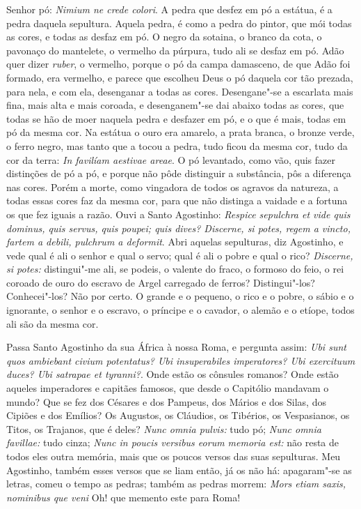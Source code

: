 Senhor pó: \emph{Nimium ne crede colori}. A pedra que desfez em pó a
estátua, é a pedra daquela sepultura. Aquela pedra, é como a pedra do
pintor, que mói todas as cores, e todas as desfaz em pó. O negro da
sotaina, o branco da cota, o pavonaço do mantelete, o vermelho da
púrpura, tudo ali se desfaz em pó. Adão quer dizer \emph{ruber}, o
vermelho, porque o pó da campa damasceno, de que Adão foi formado, era
vermelho, e parece que escolheu Deus o pó daquela
cor tão prezada, para nela, e com ela, desenganar a todas as cores.
Desengane"-se a escarlata mais fina, mais alta e mais coroada, e
desenganem"-se dai abaixo todas as cores, que todas se hão de moer
naquela pedra e desfazer em pó, e o que é mais, todas em pó da mesma
cor. Na estátua o ouro era amarelo, a prata branca, o bronze verde, o
ferro negro, mas tanto que a tocou a pedra, tudo ficou da mesma cor,
tudo da cor da terra: \emph{In favilíam aestivae areae}. O pó levantado,
como vão, quis fazer distinções de pó a pó, e porque não
pôde distinguir a substância, pôs a diferença nas cores. Porém a morte,
como vingadora de todos os agravos da natureza, a todas essas cores faz
da mesma cor, para que não distinga a vaidade e a fortuna os que fez
iguais a razão. Ouvi a Santo Agostinho: \emph{Respice sepulchra et vide
quis dominus, quis servus, quis poupei; quis dives? Discerne, si potes,
regem a vincto, fartem a debili, pulchrum a deformit}. Abri aquelas
sepulturas, diz Agostinho, e vede qual é ali o senhor e qual o servo;
qual é ali o pobre e qual o rico? \emph{Discerne, si potes:}
distingui"-me ali, se podeis, o valente do fraco, o formoso do feio, o
rei coroado de ouro do escravo de Argel carregado de ferros?
Distingui"-los? Conhecei"-los? Não por certo. O grande e o pequeno, o rico
e o pobre, o sábio e o ignorante, o senhor e o escravo, o príncipe e o
cavador, o alemão e o etíope, todos ali são da mesma cor.

Passa Santo Agostinho da sua África à nossa Roma, e pergunta
assim: \emph{Ubi sunt quos ambiebant civium potentatus? Ubi
insuperabiles imperatores? Ubi exercituum duces? Ubi satrapae et
tyranni?}. Onde estão os cônsules romanos? Onde estão aqueles
imperadores e capitães famosos, que desde o Capitólio mandavam o mundo?
Que se fez dos Césares e dos Pampeus, dos Mários e dos Silas, dos
Cipiões e dos Emílios? Os Augustos, os Cláudios, os Tibérios, os
Vespasianos, os Titos, os Trajanos, que é deles? \emph{Nunc omnia
pulvis:} tudo pó; \emph{Nunc omnia favillae:} tudo cinza; \emph{Nunc in
poucis versibus eorum memoria est:} não resta de todos eles outra
memória, mais que os poucos versos das suas sepulturas. Meu Agostinho,
também esses versos que se liam então, já os não há: apagaram"-se as
letras, comeu o tempo as pedras; também as pedras morrem: \emph{Mors
etiam saxis, nominibus que veni} Oh! que memento este para Roma!

